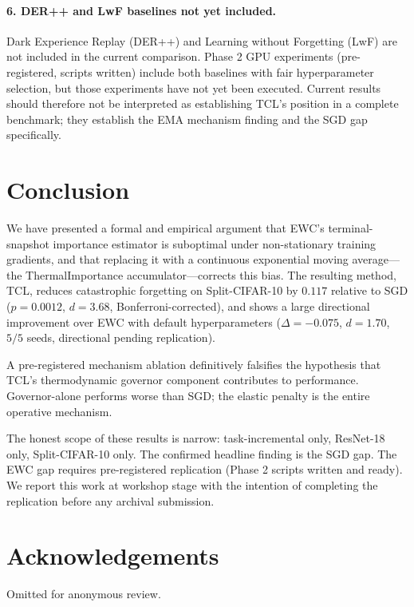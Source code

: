 \documentclass[10pt,letterpaper]{article}
\newcommand{\TCL}{\textsc{TCL}}
\newcommand{\EWC}{\textsc{EWC}}
\newcommand{\SGD}{\textsc{SGD}}
\begin{document}
\paragraph{6. DER++ and LwF baselines not yet included.}
Dark Experience Replay (DER++) and Learning without Forgetting (LwF) are not
included in the current comparison.
Phase 2 GPU experiments (pre-registered, scripts written) include both baselines
with fair hyperparameter selection, but those experiments have not yet been
executed.
Current results should therefore not be interpreted as establishing \TCL{}'s
position in a complete benchmark; they establish the EMA mechanism finding and
the SGD gap specifically.

\section{Conclusion}

We have presented a formal and empirical argument that \EWC{}'s terminal-snapshot
importance estimator is suboptimal under non-stationary training gradients,
and that replacing it with a continuous exponential moving average---the
ThermalImportance accumulator---corrects this bias.
The resulting method, \TCL{}, reduces catastrophic forgetting on Split-CIFAR-10
by $0.117$ relative to \SGD{} ($p{=}0.0012$, $d{=}3.68$, Bonferroni-corrected),
and shows a large directional improvement over \EWC{} with default hyperparameters
($\Delta{=}{-}0.075$, $d{=}1.70$, $5/5$ seeds, directional pending replication).

A pre-registered mechanism ablation definitively falsifies the hypothesis that
\TCL{}'s thermodynamic governor component contributes to performance.
Governor-alone performs worse than \SGD{}; the elastic penalty is the entire
operative mechanism.

The honest scope of these results is narrow: task-incremental only, ResNet-18 only,
Split-CIFAR-10 only.
The confirmed headline finding is the SGD gap.
The EWC gap requires pre-registered replication (Phase 2 scripts written and ready).
We report this work at workshop stage with the intention of completing the
replication before any archival submission.

\section*{Acknowledgements}

Omitted for anonymous review.



\end{document}
